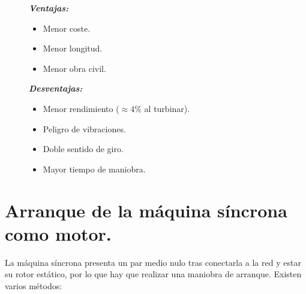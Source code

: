 \begin{itemize}
			
			\begin{figure}[H]
				\hspace{0.8cm}
				\begin{minipage}[t]{0.4\textwidth}
					\textbf{\textit{Ventajas:}}
					\begin{itemize}
						\item Menor coste.
						\item Menor longitud.
						\item Menor obra civil.
					\end{itemize}
				\end{minipage}
				\hspace{0.5cm}
				\begin{minipage}[t]{0.5\textwidth}
					\textbf{\textit{Desventajas:}}
					\begin{itemize}
						\item Menor rendimiento ($\approx 4\%$ al turbinar).
						\item Peligro de vibraciones.
						\item Doble sentido de giro.
						\item Mayor tiempo de maniobra.
					\end{itemize}
				\end{minipage}
			\end{figure}
			
		\end{itemize}

	\section{Arranque de la máquina síncrona como motor.}
		La máquina síncrona presenta un par medio nulo tras conectarla a la red y estar su rotor estático, por lo que hay que realizar una maniobra de arranque. Existen varios métodos:
		
